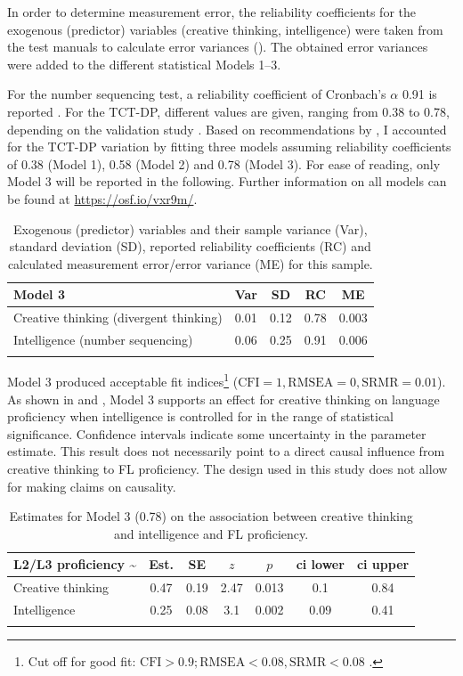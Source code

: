 \documentclass[output=paper]{langsci/langscibook}
\begin{document}
In order to determine measurement error, the reliability coefficients for the exogenous (predictor) variables (creative thinking, intelligence) were taken from the test manuals to calculate error variances (). The obtained error variances were added to the different statistical Models 1--3. 

For the number sequencing test, a reliability coefficient of Cronbach's $\alpha$ 0.91 is reported \citep{Weiss2006}. For the TCT-DP, different values are given, ranging from 0.38 to 0.78, depending on the validation study \citep{UrbanJellen1995}. Based on recommendations by \citet{WestfallYarkoni2016}, I accounted for the TCT-DP variation by fitting three models assuming reliability coefficients of 0.38 (Model 1), 0.58 (Model 2) and 0.78 (Model 3). For ease of reading, only Model 3 will be reported in the following. Further information on all models can be found at \url{https://osf.io/vxr9m/}. 

\begin{table}
\caption{\label{tab:06:1}Exogenous (predictor) variables and their sample variance (Var), standard deviation (SD), reported reliability coefficients (RC) and calculated measurement error/error variance (ME) for this sample.}
\begin{tabular}{l cccc} 
\lsptoprule
Model 3 & {Var} & {SD} & {RC} & {ME} \\\midrule
Creative thinking (divergent thinking)      & 0.01 & 0.12 & 0.78 & 0.003\\
Intelligence (number sequencing)         & 0.06 & 0.25 & 0.91 & 0.006\\
\lspbottomrule
\end{tabular}
\end{table}

Model 3 produced acceptable fit indices\footnote{Cut off for good fit: $\text{CFI} > 0.9; \text{RMSEA} < 0.08, \text{SRMR} < 0.08$ \citep{Kline2011}.} ($\text{CFI} = 1, \text{RMSEA} = 0, \text{SRMR} = 0.01$). As shown in  and , Model 3 supports an effect for creative thinking on language proficiency when intelligence is controlled for in the range of statistical significance. Confidence intervals indicate some uncertainty in the parameter estimate. This result does not necessarily point to a direct causal influence from creative thinking to FL proficiency. The design used in this study does not allow for making claims on causality. 

\begin{table}
\caption{\label{tab:06:2}Estimates for Model 3 (0.78) on the association between creative thinking and intelligence and FL proficiency.}
\begin{tabular}{l SS SS SS}
\lsptoprule
{L2/L3 proficiency {\textasciitilde}} & {Est.} & {SE} & {$z$} & {$p$} & {ci lower} & {ci upper}\\\midrule
Creative thinking & 0.47 & 0.19 & 2.47 & 0.013 & 0.1 & 0.84\\
Intelligence      & 0.25 & 0.08 & 3.1 & 0.002 & 0.09 & 0.41\\
\lspbottomrule
\end{tabular}
\end{table}
\end{document}

